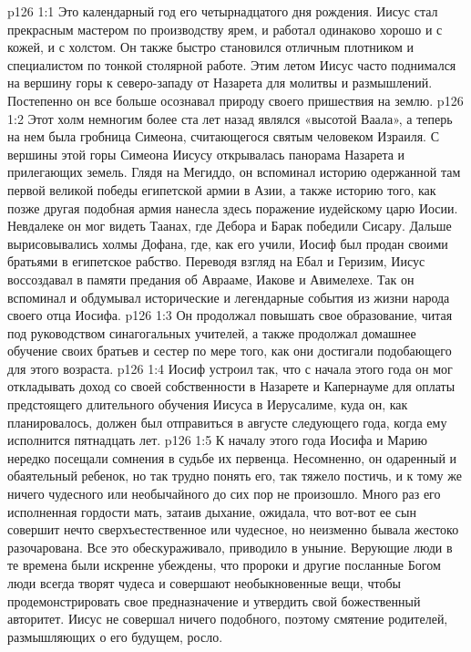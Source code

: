 \vs p126 1:1 Это календарный год его четырнадцатого дня рождения. Иисус стал прекрасным мастером по производству ярем, и работал одинаково хорошо и с кожей, и с холстом. Он также быстро становился отличным плотником и специалистом по тонкой столярной работе. Этим летом Иисус часто поднимался на вершину горы к северо\hyp{}западу от Назарета для молитвы и размышлений. Постепенно он все больше осознавал природу своего пришествия на землю.
\vs p126 1:2 Этот холм немногим более ста лет назад являлся «высотой Ваала», а теперь на нем была гробница Симеона, считающегося святым человеком Израиля. С вершины этой горы Симеона Иисусу открывалась панорама Назарета и прилегающих земель. Глядя на Мегиддо, он вспоминал историю одержанной там первой великой победы египетской армии в Азии, а также историю того, как позже другая подобная армия нанесла здесь поражение иудейскому царю Иосии. Невдалеке он мог видеть Таанах, где Дебора и Барак победили Сисару. Дальше вырисовывались холмы Дофана, где, как его учили, Иосиф был продан своими братьями в египетское рабство. Переводя взгляд на Ебал и Геризим, Иисус воссоздавал в памяти предания об Аврааме, Иакове и Авимелехе. Так он вспоминал и обдумывал исторические и легендарные события из жизни народа своего отца Иосифа.
\vs p126 1:3 Он продолжал повышать свое образование, читая под руководством синагогальных учителей, а также продолжал домашнее обучение своих братьев и сестер по мере того, как они достигали подобающего для этого возраста.
\vs p126 1:4 Иосиф устроил так, что с начала этого года он мог откладывать доход со своей собственности в Назарете и Капернауме для оплаты предстоящего длительного обучения Иисуса в Иерусалиме, куда он, как планировалось, должен был отправиться в августе следующего года, когда ему исполнится пятнадцать лет.
\vs p126 1:5 К началу этого года Иосифа и Марию нередко посещали сомнения в судьбе их первенца. Несомненно, он одаренный и обаятельный ребенок, но так трудно понять его, так тяжело постичь, и к тому же ничего чудесного или необычайного до сих пор не произошло. Много раз его исполненная гордости мать, затаив дыхание, ожидала, что вот\hyp{}вот ее сын совершит нечто сверхъестественное или чудесное, но неизменно бывала жестоко разочарована. Все это обескураживало, приводило в уныние. Верующие люди в те времена были искренне убеждены, что пророки и другие посланные Богом люди всегда творят чудеса и совершают необыкновенные вещи, чтобы продемонстрировать свое предназначение и утвердить свой божественный авторитет. Иисус не совершал ничего подобного, поэтому смятение родителей, размышляющих о его будущем, росло.

